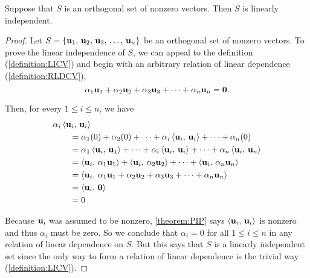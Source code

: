 \documentclass{ximera}
\begin{document}
\begin{theorem}
\label{theorem:OSLI}

Suppose that $S$ is an orthogonal set of nonzero vectors.  Then $S$ is linearly independent.

\begin{proof}
  Let $S=\left\{\mathbf{u}_{1},\,\mathbf{u}_{2},\,\mathbf{u}_{3},\,\ldots,\,\mathbf{u}_{n}\right\}$ be an orthogonal set of nonzero
  vectors.  To prove the linear independence of $S$, we can appeal to
  the definition (\ref{definition:LICV}) and begin with an arbitrary
  relation of linear dependence (\ref{definition:RLDCV}),
  \[
    \alpha_{1}\mathbf{u}_{1}+\alpha_{2}\mathbf{u}_{2}+\alpha_{3}\mathbf{u}_{3}+\cdots +\alpha_{n}\mathbf{u}_{n}=\mathbf{0}.
  \]
  
  Then, for every $1\leq i\leq n$, we have
  \begin{align*}
    &\alpha_i\innerproduct{\vect{u}_i}{\vect{u}_i}\\
    &\quad\quad=\alpha_1(0)+\alpha_2(0)+\cdots+\alpha_i\innerproduct{\vect{u}_i}{\vect{u}_i}+\cdots+\alpha_n(0)
    \\ %
    &\quad\quad=
      \alpha_1\innerproduct{\vect{u}_i}{\vect{u}_1}+
      \cdots+
      \alpha_i\innerproduct{\vect{u}_i}{\vect{u}_i}+
      \cdots+
      \alpha_n\innerproduct{\vect{u}_i}{\vect{u}_n}
    \\ %
    &\quad\quad=
      \innerproduct{\vect{u}_i}{\alpha_1\vect{u}_1}+
      \innerproduct{\vect{u}_i}{\alpha_2\vect{u}_2}+
      \cdots+
      \innerproduct{\vect{u}_i}{\alpha_n\vect{u}_n}
    \\ %
    &\quad\quad=
      \innerproduct{\vect{u}_i}{\lincombo{\alpha}{u}{n}}
    \\ %
    &\quad\quad=
      \innerproduct{\vect{u}_i}{\zerovector}
    \\ %
    &\quad\quad=0
    \\ %
  \end{align*}
  
  Because $\mathbf{u}_i$ was assumed to be nonzero, \ref{theorem:PIP}
  says $\left\langle\mathbf{u}_i,\,\mathbf{u}_i\right\rangle$ is nonzero and thus
  $\alpha_i$ must be zero.  So we conclude that $\alpha_i=0$ for all
  $1\leq i\leq n$ in any relation of linear dependence on $S$.  But
  this says that $S$ is a linearly independent set since the only way
  to form a relation of linear dependence is the trivial way
  (\ref{definition:LICV}).
\end{proof}
\end{theorem}
\end{document}

